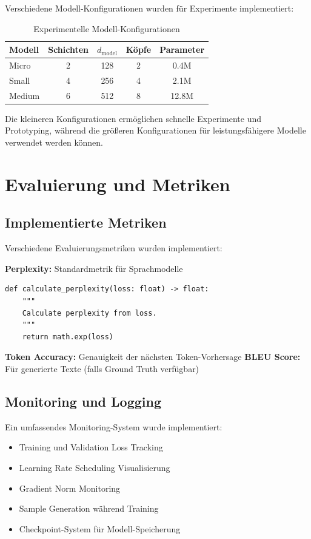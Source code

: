Verschiedene Modell-Konfigurationen wurden für Experimente implementiert:

\begin{table}[h]
\centering
\begin{tabular}{|l|c|c|c|c|}
\hline
\textbf{Modell} & \textbf{Schichten} & \textbf{$d_{\text{model}}$} & \textbf{Köpfe} & \textbf{Parameter} \\
\hline
Micro & 2 & 128 & 2 & 0.4M \\
Small & 4 & 256 & 4 & 2.1M \\
Medium & 6 & 512 & 8 & 12.8M \\
\hline
\end{tabular}
\caption{Experimentelle Modell-Konfigurationen}
\label{tab:model_configs}
\end{table}

Die kleineren Konfigurationen ermöglichen schnelle Experimente und Prototyping, während die größeren Konfigurationen für leistungsfähigere Modelle verwendet werden können.

\section{Evaluierung und Metriken}

\subsection{Implementierte Metriken}

Verschiedene Evaluierungsmetriken wurden implementiert:

\textbf{Perplexity:} Standardmetrik für Sprachmodelle
\begin{lstlisting}[style=pythonstyle, caption=Perplexity Berechnung]
def calculate_perplexity(loss: float) -> float:
    """
    Calculate perplexity from loss.
    """
    return math.exp(loss)
\end{lstlisting}

\textbf{Token Accuracy:} Genauigkeit der nächsten Token-Vorhersage
\textbf{BLEU Score:} Für generierte Texte (falls Ground Truth verfügbar)

\subsection{Monitoring und Logging}

Ein umfassendes Monitoring-System wurde implementiert:
\begin{itemize}
    \item Training und Validation Loss Tracking
    \item Learning Rate Scheduling Visualisierung
    \item Gradient Norm Monitoring
    \item Sample Generation während Training
    \item Checkpoint-System für Modell-Speicherung
\end{itemize}

